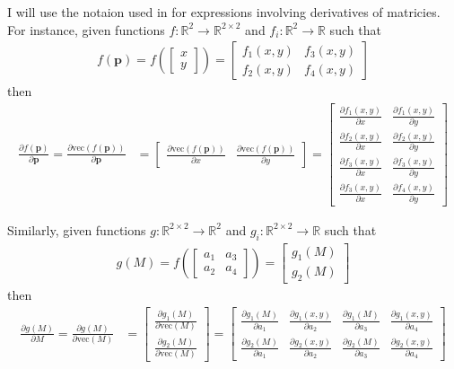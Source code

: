 \documentclass{article}
\newcommand\Real{\mathbb{R}}
\newcommand\vecop[1]{\text{vec} \left( #1\right)}
\begin{document}
I will use the notaion used in \cite{claraco_tutorial_nodate} for expressions
involving derivatives of matricies. For instance,
given functions $f : \Real^2 \to \Real^{2 \times 2}$ and $f_i : \Real^2 \to \Real$ such that 
\begin{align}
  f(\bm{p}) = f \left( \begin{bmatrix} x \\ y \end{bmatrix} \right) = \begin{bmatrix} f_1(x,y) & f_3(x,y) \\ f_2(x,y) & f_4(x,y) \end{bmatrix}
\end{align}
then 
\begin{align}
  \frac{\partial f(\bm{p})}{\partial \bm{p}} = \frac{\partial \vecop{f(\bm{p})}}{\partial \bm{p}} 
  &= \begin{bmatrix} 
      \frac{\partial \vecop{f(\bm{p})}}{\partial x} & 
      \frac{\partial \vecop{f(\bm{p})}}{\partial y}
    \end{bmatrix}
  = \begin{bmatrix} 
    \frac{\partial f_1(x,y)}{\partial x} & \frac{\partial f_1(x,y)}{\partial y}   \\[10pt]
      \frac{\partial f_2(x,y)}{\partial x} & \frac{\partial f_2(x,y)}{\partial y} \\[10pt]
      \frac{\partial f_3(x,y)}{\partial x} & \frac{\partial f_3(x,y)}{\partial y} \\[10pt]
      \frac{\partial f_3(x,y)}{\partial x} & \frac{\partial f_4(x,y)}{\partial y}
     \end{bmatrix}
\end{align}

Similarly, given functions $g : \Real^{2 \times 2} \to \Real^2$ and  $g_i : \Real^{2 \times 2} \to \Real$ such that 
\begin{align}
  g(M) = f \left( \begin{bmatrix} a_1 & a_3 \\ a_2 & a_4 \end{bmatrix}\right) = \begin{bmatrix} g_1(M) \\ g_2(M) \end{bmatrix}
\end{align}
then 
\begin{align}
  \frac{\partial g(M)}{\partial M} = \frac{\partial g(M)}{\partial \vecop{M}}
  &= \begin{bmatrix} 
      \frac{\partial g_1(M)}{\partial \vecop{M}} \\[5pt]
      \frac{\partial g_2(M)}{\partial \vecop{M}}
     \end{bmatrix}
  = \begin{bmatrix} 
      \frac{\partial g_1(M)}{\partial a_1} & \frac{\partial g_1(x,y)}{\partial a_2} &
      \frac{\partial g_1(M)}{\partial a_3} & \frac{\partial g_1(x,y)}{\partial a_4}\\[5pt]
      \frac{\partial g_2(M)}{\partial a_1} & \frac{\partial g_2(x,y)}{\partial a_2} &
      \frac{\partial g_2(M)}{\partial a_3} & \frac{\partial g_2(x,y)}{\partial a_4}
     \end{bmatrix}
\end{align}
\end{document}
